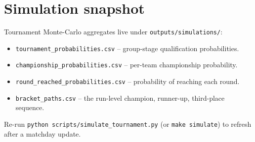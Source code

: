 \section*{Simulation snapshot}
Tournament Monte-Carlo aggregates live under \texttt{outputs/simulations/}:
\begin{itemize}
  \item \texttt{tournament\_probabilities.csv} -- group-stage qualification
        probabilities.
  \item \texttt{championship\_probabilities.csv} -- per-team championship
        probability.
  \item \texttt{round\_reached\_probabilities.csv} -- probability of reaching
        each round.
  \item \texttt{bracket\_paths.csv} -- the run-level champion, runner-up,
        third-place sequence.
\end{itemize}
Re-run \texttt{python scripts/simulate\_tournament.py} (or \texttt{make simulate})
to refresh after a matchday update.
